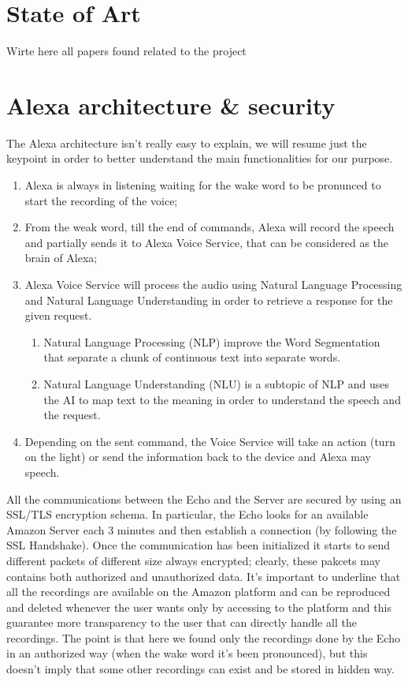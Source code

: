 \documentclass[sigconf]{acmart}
\begin{document}
    \section{State of Art}
    Wirte here all papers found related to the project


    \section{Alexa architecture \& security}
    The Alexa architecture isn't really easy to explain, we will resume just the keypoint in order to better understand the main functionalities for our purpose.
    \begin{enumerate}
        \item Alexa is always in listening waiting for the wake word to be pronunced to start the recording of the voice;
        \item From the weak word, till the end of commands, Alexa will record the speech and partially sends it to Alexa Voice Service, that can be considered as the brain of Alexa;
        \item Alexa Voice Service will process the audio using Natural Language Processing and Natural Language Understanding in order to retrieve a response for the given request.
        \begin{enumerate}
            \item Natural Language Processing (NLP) improve the Word Segmentation that separate a chunk of continuous text into separate words.
            \item Natural Language Understanding (NLU) is a subtopic of NLP and uses the AI to map text to the meaning\cite{NLU} in order to understand the speech and the request.
        \end{enumerate}
        \item Depending on the sent command, the Voice Service will take an action (turn on the light) or send the information back to the device and Alexa may speech.
    \end{enumerate}
    All the communications between the Echo and the Server are secured by using an SSL/TLS encryption schema.
    In particular, the Echo looks for an available Amazon Server each 3 minutes and then establish a connection (by following the SSL Handshake).
    Once the communication has been initialized it starts to send different packets of different size always encrypted; clearly, these pakcets may contains both authorized and unauthorized data.
    It's important to underline that all the recordings are available on the Amazon platform and can be reproduced and deleted whenever the user wants only by accessing to the platform and this guarantee more transparency to the user that can directly handle all the recordings.
    The point is that here we found only the recordings done by the Echo in an authorized way (when the wake word it's been pronounced), but this doesn't imply that some other recordings can exist and be stored in hidden way.
\end{document}
